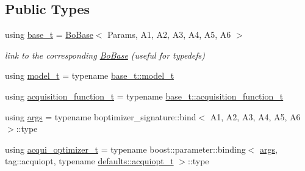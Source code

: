 \subsection*{Public Types}
\begin{DoxyCompactItemize}
\item 
using \hyperlink{classlimbo_1_1bayes__opt_1_1_b_optimizer_a85523f927879dc96892358bb27347523}{base\+\_\+t} = \hyperlink{classlimbo_1_1bayes__opt_1_1_bo_base}{Bo\+Base}$<$ Params, A1, A2, A3, A4, A5, A6 $>$
\begin{DoxyCompactList}\small\item\em link to the corresponding \hyperlink{classlimbo_1_1bayes__opt_1_1_bo_base}{Bo\+Base} (useful for typedefs) \end{DoxyCompactList}\item 
using \hyperlink{classlimbo_1_1bayes__opt_1_1_b_optimizer_af429e74c89915450c03f563e093766ea}{model\+\_\+t} = typename \hyperlink{classlimbo_1_1bayes__opt_1_1_bo_base_a5e23d523dd2a16b866a2660721b937bb}{base\+\_\+t\+::model\+\_\+t}
\item 
using \hyperlink{classlimbo_1_1bayes__opt_1_1_b_optimizer_a1d05da5c1a8bb581fab63db1cab87cd9}{acquisition\+\_\+function\+\_\+t} = typename \hyperlink{classlimbo_1_1bayes__opt_1_1_bo_base_a5abe502b49e1ee70d5e00f27f95f5dff}{base\+\_\+t\+::acquisition\+\_\+function\+\_\+t}
\item 
using \hyperlink{classlimbo_1_1bayes__opt_1_1_b_optimizer_a52ac13dea70e065c44b51a7ee7fef503}{args} = typename boptimizer\+\_\+signature\+::bind$<$ A1, A2, A3, A4, A5, A6 $>$\+::type
\item 
using \hyperlink{classlimbo_1_1bayes__opt_1_1_b_optimizer_a5ade62cb11aeb891ed13059d6bed28d2}{acqui\+\_\+optimizer\+\_\+t} = typename boost\+::parameter\+::binding$<$ \hyperlink{classlimbo_1_1bayes__opt_1_1_bo_base_a800d7d9dec5ac0c12b93150f12db9be3}{args}, tag\+::acquiopt, typename \hyperlink{structlimbo_1_1bayes__opt_1_1_b_optimizer_1_1defaults_a354391108ed6c10e11e7c356b3a08c25}{defaults\+::acquiopt\+\_\+t} $>$\+::type
\end{DoxyCompactItemize}
